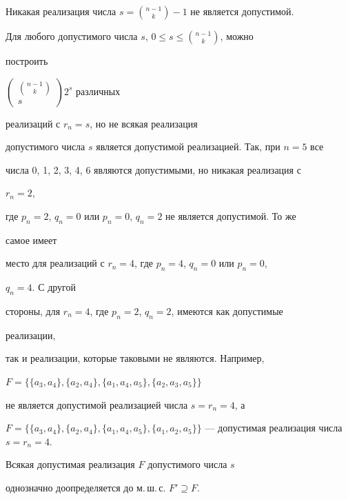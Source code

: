  


 


\begin{cornonum} 


Никакая реализация числа $s=\binom{n-1}{k}-1$ не является допустимой. 


\end{cornonum} 


 


Для любого допустимого числа $s$, $0\le s\le\binom{n-1}{k}$, можно 


построить 


$\begin{pmatrix} \binom{n-1}{k} \\ s \end{pmatrix}2^s$ различных 


реализаций с $r_n=s$, но не всякая реализация 


допустимого числа $s$ является допустимой реализацией. Так, при $n=5$ все 


числа 0, 1, 2, 3, 4, 6 являются допустимыми, но никакая реализация с 


$r_n=2$, 


где $p_n=2$, $q_n=0$ или $p_n=0$, $q_n=2$ не является допустимой. То же 


самое имеет 


место для реализаций с $r_n=4$, где $p_n=4$, $q_n=0$ или $p_n=0$, 


$q_n=4$. С другой 


стороны, для $r_n=4$, где $p_n=2$, $q_n=2$, имеются как допустимые 


реализации, 


так и реализации, которые таковыми не являются. Например, 


$F=\big\{\{a_3,a_4\}, \{a_2,a_4\}, \{a_1,a_4,a_5\}, 


\{a_2,a_3,a_5\}\big\}$ 


не является допустимой реализацией числа $s=r_n=4$, а 


$F=\big\{\{a_3,a_4\}, \{a_2,a_4\}, \{a_1,a_4,a_5\}, 


\{a_1,a_2,a_5\}\big\}$ --- допустимая реализация числа $s=r_n=4$. 


 


 


\begin{propnonum} 


Всякая допустимая реализация $F$ допустимого числа $s$ 


однозначно доопределяется до м.\,ш.\,с. $F'\supseteq F$. 


\end{propnonum} 



